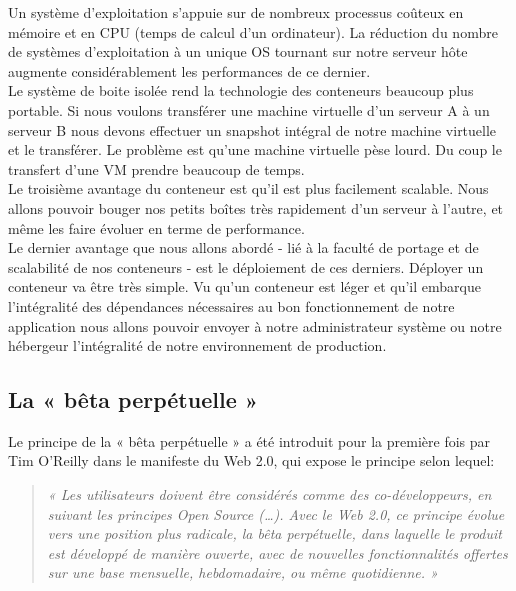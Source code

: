       Un système d’exploitation s’appuie sur de nombreux processus coûteux en mémoire et en CPU (temps de calcul d’un ordinateur). La réduction du nombre de systèmes d’exploitation à un unique OS tournant sur notre serveur hôte augmente considérablement les performances de ce dernier.\\

      Le système de boite isolée rend la technologie des conteneurs beaucoup plus portable. Si nous voulons transférer une machine virtuelle d’un serveur A à un serveur B nous devons effectuer un snapshot intégral de notre machine virtuelle et le transférer. Le problème est qu’une machine virtuelle pèse lourd. Du coup le transfert d’une VM prendre beaucoup de temps.\\

      Le troisième avantage du conteneur est qu’il est plus facilement scalable. Nous allons pouvoir bouger nos petits boîtes très rapidement d’un serveur à l’autre, et même les faire évoluer en terme de performance.\\

      Le dernier avantage que nous allons abordé - lié à la faculté de portage et de scalabilité de nos conteneurs - est le déploiement de ces derniers. Déployer un conteneur va être très simple. Vu qu’un conteneur est léger et qu’il embarque l’intégralité des dépendances nécessaires au bon fonctionnement de notre application nous allons pouvoir envoyer à notre administrateur système ou notre hébergeur l’intégralité de notre environnement de production.

    \subsection{La « bêta perpétuelle »}
    Le principe de la « bêta perpétuelle » a été introduit pour la première fois par Tim O’Reilly dans le manifeste du Web 2.0, qui expose le principe selon lequel:\\
    \begin{quotation}
      \emph{« Les utilisateurs doivent être considérés comme des co-développeurs, en suivant les principes Open Source (…). Avec le Web 2.0, ce principe évolue vers une position plus radicale, la bêta perpétuelle, dans laquelle le produit est développé de manière ouverte, avec de nouvelles fonctionnalités offertes sur une base mensuelle, hebdomadaire, ou même quotidienne. »}\\
    \end{quotation}

